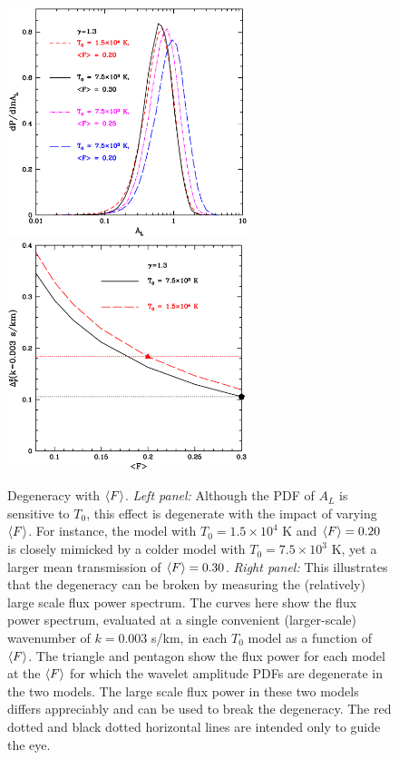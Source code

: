 \begin{figure}[t]
\includegraphics[width=7cm]{f12a.eps}
\includegraphics[width=7cm]{f12b.eps}
\caption{Degeneracy with $\langle F \rangle$. {\it Left panel:} Although the PDF of $A_L$ is sensitive
to $T_0$, this effect is degenerate with the impact of varying $\langle F \rangle$. For instance, the model with $T_0 = 1.5 \times 10^4$ K
and $\langle F \rangle = 0.20$ is closely mimicked by a colder model with $T_0=7.5 \times 10^3$ K, yet a larger mean transmission of
$\langle F \rangle = 0.30$. {\it Right panel:} This illustrates that the degeneracy can be broken by measuring the (relatively) large
scale flux power spectrum. The curves here show the flux power spectrum, evaluated at a single convenient (larger-scale) wavenumber of $k=0.003$ s/km, 
in each $T_0$ model as a function of $\langle F \rangle$. The triangle and pentagon show the flux power for each model at the
$\langle F \rangle$ for which the wavelet amplitude PDFs are degenerate in the two models. The large scale flux power in these
two models differs appreciably and can be used to break the degeneracy. The red dotted and black dotted horizontal lines are intended 
only to guide the eye.}
\label{fig:degen_break}
\end{figure}


